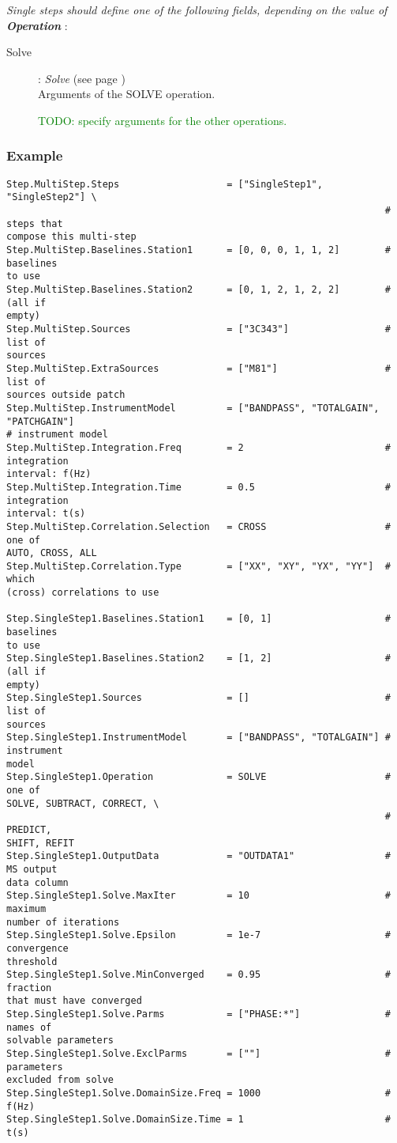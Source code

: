 \documentclass[10pt]{lofar}
\begin{document}
\emph{Single steps should define one of the following fields, depending on the
value of \textbf{Operation}} :
\begin{description}
\item [Solve] : \emph{Solve} (see page \pageref{app-solve}) \\
    Arguments of the SOLVE operation. \par
    \textcolor{green}{TODO: specify arguments for the other operations.}
\end{description}

\subsubsection*{Example}
{\footnotesize
\begin{verbatim}
Step.MultiStep.Steps                   = ["SingleStep1", "SingleStep2"] \
                                                                   # steps that
compose this multi-step
Step.MultiStep.Baselines.Station1      = [0, 0, 0, 1, 1, 2]        # baselines
to use
Step.MultiStep.Baselines.Station2      = [0, 1, 2, 1, 2, 2]        # (all if
empty)
Step.MultiStep.Sources                 = ["3C343"]                 # list of
sources
Step.MultiStep.ExtraSources            = ["M81"]                   # list of
sources outside patch
Step.MultiStep.InstrumentModel         = ["BANDPASS", "TOTALGAIN", "PATCHGAIN"]
# instrument model
Step.MultiStep.Integration.Freq        = 2                         # integration
interval: f(Hz)
Step.MultiStep.Integration.Time        = 0.5                       # integration
interval: t(s)
Step.MultiStep.Correlation.Selection   = CROSS                     # one of
AUTO, CROSS, ALL
Step.MultiStep.Correlation.Type        = ["XX", "XY", "YX", "YY"]  # which
(cross) correlations to use

Step.SingleStep1.Baselines.Station1    = [0, 1]                    # baselines
to use
Step.SingleStep1.Baselines.Station2    = [1, 2]                    # (all if
empty)
Step.SingleStep1.Sources               = []                        # list of
sources
Step.SingleStep1.InstrumentModel       = ["BANDPASS", "TOTALGAIN"] # instrument
model
Step.SingleStep1.Operation             = SOLVE                     # one of
SOLVE, SUBTRACT, CORRECT, \
                                                                   # PREDICT,
SHIFT, REFIT
Step.SingleStep1.OutputData            = "OUTDATA1"                # MS output
data column
Step.SingleStep1.Solve.MaxIter         = 10                        # maximum
number of iterations
Step.SingleStep1.Solve.Epsilon         = 1e-7                      # convergence
threshold
Step.SingleStep1.Solve.MinConverged    = 0.95                      # fraction
that must have converged
Step.SingleStep1.Solve.Parms           = ["PHASE:*"]               # names of
solvable parameters
Step.SingleStep1.Solve.ExclParms       = [""]                      # parameters
excluded from solve
Step.SingleStep1.Solve.DomainSize.Freq = 1000                      # f(Hz)
Step.SingleStep1.Solve.DomainSize.Time = 1                         # t(s)


\end{verbatim}}
\end{document}
